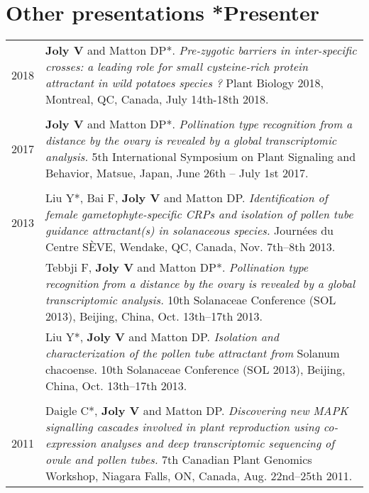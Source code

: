 \documentclass[letterpaper,10pt]{article}
\begin{document}
\bigskip
\bigskip

\section[Other presentations]{Other presentations \hfill \small{*Presenter}}
\begin{tabular}{r|p{15.1cm}}

2018

& \textbf{Joly V} and Matton DP*.
  \emph{Pre-zygotic barriers in inter-specific crosses: a leading role for small
  cysteine-rich protein attractant in wild potatoes species ?}
  Plant Biology 2018, Montreal, QC, Canada, July 14th-18th 2018.
  \\

\multicolumn{2}{c}{} \\

2017

& \textbf{Joly V} and Matton DP*.
  \emph{Pollination type recognition from a distance by the ovary is revealed
  by a global transcriptomic analysis.}
  5th International Symposium on Plant Signaling and Behavior, Matsue, Japan,
  June 26th -- July 1st 2017.
  \\

\multicolumn{2}{c}{} \\

2013

& Liu Y*, Bai F, \textbf{Joly V} and Matton DP.
  \emph{Identification of female gametophyte-specific CRPs and isolation of
  pollen tube guidance attractant(s) in solanaceous species.}
  Journées du Centre SÈVE, Wendake, QC, Canada, Nov. 7th--8th 2013.
  \vspace{1.5mm} \\

& Tebbji F, \textbf{Joly V} and Matton DP*. \emph{Pollination type recognition
  from a distance by the ovary is revealed by a global transcriptomic analysis.}
  10th Solanaceae Conference (SOL 2013), Beijing, China, Oct. 13th--17th 2013.
  \vspace{1.5mm} \\

& Liu Y*, \textbf{Joly V} and Matton DP.
  \emph{Isolation and characterization of the pollen tube attractant from}
  Solanum chacoense. 10th Solanaceae Conference (SOL 2013), Beijing, China,
  Oct. 13th--17th 2013. \\

\multicolumn{2}{c}{} \\

2011

& Daigle C*, \textbf{Joly V} and Matton DP.
  \emph{Discovering new MAPK signalling cascades involved in plant reproduction
  using co-expression analyses and deep transcriptomic sequencing of ovule
  and pollen tubes.}
  7th Canadian Plant Genomics Workshop, Niagara Falls, ON, Canada,
  Aug. 22nd--25th 2011.
  \\

\end{tabular}
\end{document}
